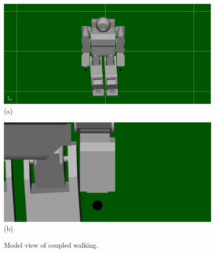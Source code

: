 \documentclass[11pt,a4paper]{jsarticle}
\begin{document}
\newpage
\begin{figure}[h]
  \begin{minipage}{0.45\linewidth}
    \centering
    \includegraphics[width=1.0\linewidth]{./fig/coupled.png}
    \footnotesize{\hspace{30pt}(a)}
  \end{minipage}
  \begin{minipage}{0.1\linewidth}
    \centering
    \hspace{-0.1mm}
  \end{minipage}
  \begin{minipage}{0.45\linewidth}
    \centering
    \includegraphics[width=1.0\linewidth]{./fig/01V2.png}
    \footnotesize{\hspace{30pt}(b)}
  \end{minipage}
  \caption{Model view of coupled walking.}
  \label{fig:No1}
\end{figure}
\end{document}
